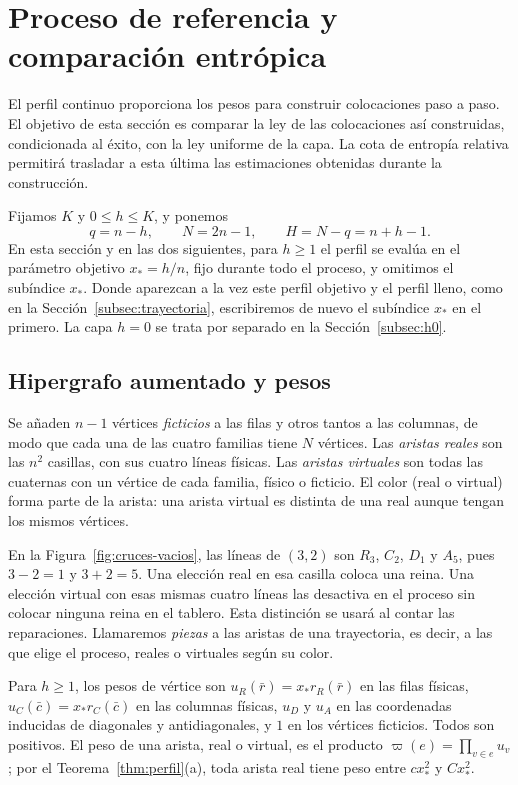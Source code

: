 \section{Proceso de referencia y comparación entrópica}\label{sec:referencia}

El perfil continuo proporciona los pesos para construir colocaciones paso a paso.
El objetivo de esta sección es comparar la ley de las colocaciones así construidas,
condicionada al éxito, con la ley uniforme de la capa. La cota de entropía relativa
permitirá trasladar a esta última las estimaciones obtenidas durante la construcción.

Fijamos $K$ y $0\le h\le K$, y ponemos
\[
 q=n-h,\qquad N=2n-1,\qquad H=N-q=n+h-1 .
\]
En esta sección y en las dos siguientes, para $h\ge1$ el perfil se evalúa en el parámetro
objetivo $x_*=h/n$, fijo durante todo el proceso, y omitimos el subíndice $x_*$. Donde aparezcan
a la vez este perfil objetivo y el perfil lleno, como en la Sección~\ref{subsec:trayectoria},
escribiremos de nuevo el subíndice $x_*$ en el primero. La capa $h=0$
se trata por separado en la Sección~\ref{subsec:h0}.

\subsection{Hipergrafo aumentado y pesos}

Se añaden $n-1$ vértices \emph{ficticios} a las filas y otros tantos a las columnas, de modo que
cada una de las cuatro familias tiene $N$ vértices. Las \emph{aristas reales} son las $n^2$
casillas, con sus cuatro líneas físicas. Las \emph{aristas virtuales} son todas las cuaternas
con un vértice de cada familia, físico o ficticio. El color (real o virtual) forma parte de la
arista: una arista virtual es distinta de una real aunque tengan los mismos vértices.

En la Figura~\ref{fig:cruces-vacios}, las líneas de $(3,2)$ son $R_3$, $C_2$,
$D_1$ y $A_5$, pues $3-2=1$ y $3+2=5$.
Una elección real en esa casilla coloca una reina. Una elección virtual con
esas mismas cuatro líneas las desactiva en el proceso sin colocar ninguna
reina en el tablero. Esta distinción se usará al contar las reparaciones. Llamaremos \emph{piezas} a las
aristas de una
trayectoria, es decir, a las que elige el proceso, reales o virtuales según su color.

Para $h\ge1$, los pesos de vértice son $u_R(\bar r)=x_*r_R(\bar r)$ en las filas físicas,
$u_C(\bar c)=x_*r_C(\bar c)$ en las columnas físicas, $u_D$ y $u_A$ en las coordenadas inducidas
de diagonales y antidiagonales, y $1$ en los vértices ficticios. Todos son positivos. El peso de
una arista, real o virtual, es el producto $\varpi(e)=\prod_{v\in e}u_v$; por el
Teorema~\ref{thm:perfil}(a), toda arista real tiene peso entre $cx_*^2$ y $Cx_*^2$.

